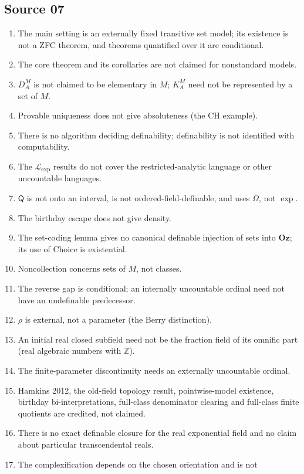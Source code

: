 \documentclass[11pt,a4paper]{article}
\numberwithin{equation}{section}
\theoremstyle{definition}
\theoremstyle{remark}
\newcommand{\Oz}{\mathbf{Oz}}
\newcommand{\Z}{\mathbb Z}
\newcommand{\Mc}{\mathsf Q}
\newcommand{\Lexp}{\mathcal L_{\exp}}
\begin{document}
\subsection{Source 07}
\begin{enumerate}[label=N7.\arabic*]
\item The main setting is an externally fixed transitive set model; its
existence is not a ZFC theorem, and theorems quantified over it are
conditional.
\item The core theorem and its corollaries are not claimed for nonstandard
models.
\item $D^M_A$ is not claimed to be elementary in $M$; $K^M_A$ need not be
represented by a set of $M$.
\item Provable uniqueness does not give absoluteness (the CH example).
\item There is no algorithm deciding definability; definability is not
identified with computability.
\item The $\Lexp$ results do not cover the restricted-analytic language or
other uncountable languages.
\item $\Mc$ is not onto an interval, is not ordered-field-definable, and uses
$\Omega$, not $\exp$.
\item The birthday escape does not give density.
\item The set-coding lemma gives no canonical definable injection of sets
into $\Oz$; its use of Choice is existential.
\item Noncollection concerns sets of $M$, not classes.
\item The reverse gap is conditional; an internally uncountable ordinal
need not have an undefinable predecessor.
\item $\rho$ is external, not a parameter (the Berry distinction).
\item An initial real closed subfield need not be the fraction field of its
omnific part (real algebraic numbers with $\Z$).
\item The finite-parameter discontinuity needs an externally uncountable
ordinal.
\item Hamkins 2012, the old-field topology result, pointwise-model
existence, birthday bi-interpretations, full-class denominator clearing and
full-class finite quotients are credited, not claimed.
\item There is no exact definable closure for the real exponential field and
no claim about particular transcendental reals.
\item The complexification depends on the chosen orientation and is not

\end{enumerate}
\end{document}
